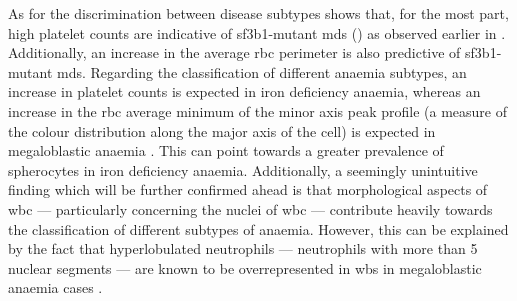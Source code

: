 As for the discrimination between disease subtypes shows that, for the most part, high platelet counts are indicative of \ac{sf3b1}-mutant \ac{mds} () as observed earlier in . Additionally, an increase in the average \ac{rbc} perimeter is also predictive of \ac{sf3b1}-mutant \ac{mds}. Regarding the classification of different anaemia subtypes, an increase in platelet counts is expected in iron deficiency anaemia, whereas an increase in the \ac{rbc} average minimum of the minor axis peak profile (a measure of the colour distribution along the major axis of the cell) is expected in megaloblastic anaemia . This can point towards a greater prevalence of spherocytes in iron deficiency anaemia. Additionally, a seemingly unintuitive finding which will be further confirmed ahead is that morphological aspects of \ac{wbc} --- particularly concerning the nuclei of \ac{wbc} --- contribute heavily towards the classification of different subtypes of anaemia. However, this can be explained by the fact that hyperlobulated neutrophils --- neutrophils with more than 5 nuclear segments --- are known to be overrepresented in \ac{wbs} in megaloblastic anaemia cases \cite{Hariz2021-qw}.

\begin{figure}[!ht]
    \label{fig:feature-importance-mds}
\end{figure}

\begin{figure}[!ht]
    \label{fig:feature-importance-anaemia}
\end{figure}


